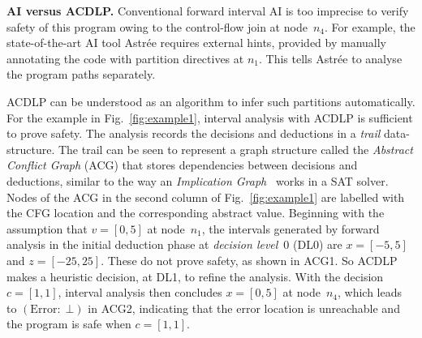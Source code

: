 \medskip

\noindent \textbf{AI versus ACDLP.}
Conventional forward interval AI is too imprecise to verify safety of this
program owing to the control-flow join at node~$n_4$.  For example, the
state-of-the-art AI tool Astr{\'e}e requires external hints, provided by
manually annotating the code with partition directives at $n_1$.  This
tells Astr{\'e}e to analyse the program paths separately.

ACDLP can be understood as an algorithm to infer such
partitions automatically.  For the example in Fig.~\ref{fig:example1}, interval analysis
with ACDLP is sufficient to prove safety.  The analysis records the
decisions and deductions in a \textit{trail} data-structure.  The trail can
be seen to represent a graph structure called the {\em Abstract Conflict
Graph} (ACG) that stores dependencies between decisions and deductions, similar to the way an \emph{Implication Graph}~\cite{cdcl} works in a SAT solver. 
Nodes of the ACG in the second column of Fig.~\ref{fig:example1} are
labelled with the CFG location and the corresponding abstract value. 
Beginning with the assumption that $v=[0,5]$ at node~$n_1$, the intervals
generated by forward analysis in the initial deduction phase at
\emph{decision level}~0 (DL0) are $x=[-5,5]$ and $z=[-25,25]$.  
These do not prove safety, as shown in ACG1.  So ACDLP makes a
heuristic decision, at DL1, to refine the analysis.  With the decision
$c=[1,1]$, interval analysis then concludes $x=[0,5]$ at node~$n_4$, which
leads to $(\mathrm{Error}{:}\;\bot)$ in ACG2, indicating that the error
location is unreachable and the program is safe when $c=[1,1]$.

